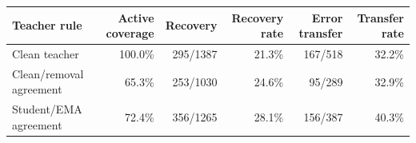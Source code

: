 \begin{tabular}{lrrrrr}
\toprule
Teacher rule & Active coverage & Recovery & Recovery rate & Error transfer & Transfer rate \\
\midrule
Clean teacher & 100.0\% & 295/1387 & 21.3\% & 167/518 & 32.2\% \\
Clean/removal agreement & 65.3\% & 253/1030 & 24.6\% & 95/289 & 32.9\% \\
Student/EMA agreement & 72.4\% & 356/1265 & 28.1\% & 156/387 & 40.3\% \\
\bottomrule
\end{tabular}